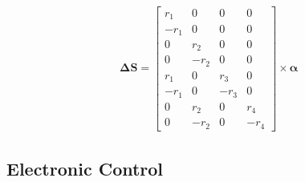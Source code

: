 \begin{align}
    \boldsymbol{\Delta S} = 
    \begin{bmatrix}
        r_1&0&0&0\\
        -r_1&0&0&0\\
        0&r_2&0&0\\
        0&-r_2&0&0\\
        r_1&0&r_3&0\\
        -r_1&0&-r_3&0\\
        0&r_2&0&r_4\\
        0&-r_2&0&-r_4
    \end{bmatrix}
    \times
    \boldsymbol{\alpha}
    \label{eq:deltaS_matrix}
\end{align}
\subsection{Electronic Control}
